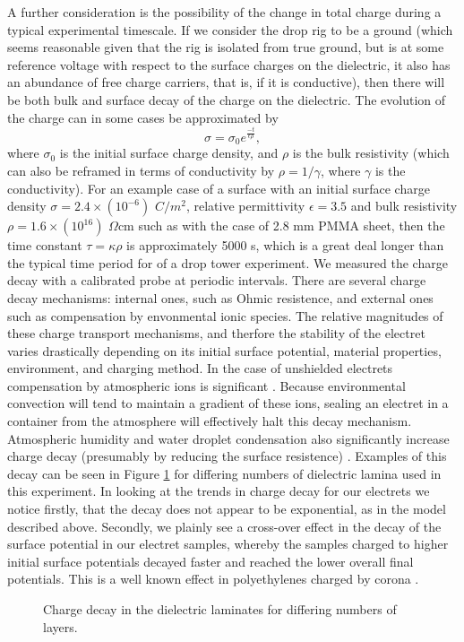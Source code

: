 \documentclass[12pt,a4paper,oneside]{book}
\begin{document}
A further consideration is the possibility of the change in total charge during a typical experimental timescale. If we consider the drop rig to be a ground (which seems reasonable given that the rig is isolated from true ground, but is at some reference voltage with respect to the surface charges on the dielectric, it also has an abundance of free charge carriers, that is, if it is conductive), then there will be both bulk and surface decay of the charge on the dielectric. The evolution of the charge can in some cases be approximated by
\[ \sigma = \sigma_0 e^{\frac{-t}{\epsilon \rho}}, \]
where $\sigma_0$ is the initial surface charge density, and $\rho$ is the bulk resistivity (which can also be reframed in terms of conductivity by $\rho = 1/\gamma$, where $\gamma$ is the conductivity). For an example case of a surface with an initial surface charge density $\sigma = 2.4 \times (10^{-6})$ $C/m^2$, relative permittivity $\epsilon = 3.5$ and bulk resistivity $\rho = 1.6 \times (10^{16})$ $\Omega$cm such as with the case of 2.8 mm PMMA sheet, then the time constant $\tau = \kappa \rho$ is approximately 5000 s, which is a great deal longer than the typical time period for of a drop tower experiment. We measured the charge decay with a calibrated probe at periodic intervals. There are several charge decay mechanisms: internal ones, such as Ohmic resistence, and external ones such as compensation by envonmental ionic species. The relative magnitudes of these charge transport mechanisms, and therfore the stability of the electret varies drastically depending on its initial surface potential, material properties, environment, and charging method. In the case of unshielded electrets compensation by atmospheric ions is significant \cite{perlman_electrets_1973}. Because environmental convection will tend to  maintain a gradient of these ions, sealing an electret in a container from the atmosphere will effectively halt this decay mechanism. Atmospheric humidity and water droplet condensation also significantly increase charge decay (presumably by reducing the surface resistence) \cite{haenen_characteristic_1975}. Examples of this decay can be seen in Figure \ref{fig:charge_decay} for differing numbers of dielectric lamina used in this experiment. In looking at the trends in charge decay for our electrets we notice firstly, that the decay does not appear to be exponential, as in the model described above. Secondly, we plainly see a cross-over effect in the decay of the surface potential in our electret samples, whereby the samples charged to higher initial surface potentials decayed faster and reached the lower overall final potentials. This is a well known effect in polyethylenes charged by corona \cite{ferreira_corona_1992}.
\begin{figure}[htb!]
    \centering
    {}
       \caption{Charge decay in the dielectric laminates for differing numbers of layers.\label{fig:charge_decay}}
\end{figure}
\newpage
\end{document}
